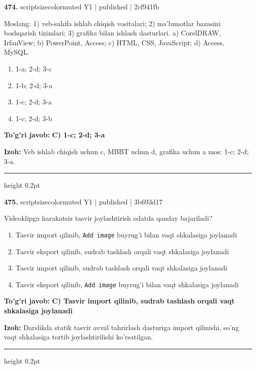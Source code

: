 \documentclass[10pt,a4paper]{article}
\begin{document}
{\bfseries\sffamily\color{ink} 474.} {scriptsizecolor{muted} Y1 | published | 2cf941fb}
\par
Moslang: 1) veb-sahifa ishlab chiqish vositalari; 2) ma'lumotlar bazasini boshqarish tizimlari; 3) grafika bilan ishlash dasturlari. a) CorelDRAW, IrfanView; b) PowerPoint, Access; c) HTML, CSS, JavaScript; d) Access, MySQL.
\begin{enumerate}[label=\Alph*),leftmargin=9mm]
\item 1-a; 2-d; 3-c
\item 1-b; 2-d; 3-a
\item 1-c; 2-d; 3-a
\item 1-c; 2-d; 3-b
\end{enumerate}
\begin{tcolorbox}[enhanced,breakable,colback=teal!4,colframe=teal!60!black,boxrule=0.45pt,arc=1.2mm,left=2.7mm,right=2.7mm,top=1.8mm,bottom=1.8mm,before skip=2mm,after skip=2mm]
{\bfseries\sffamily\color{teal}To'g'ri javob:} \textbf{C) 1-c; 2-d; 3-a}
\par\smallskip
{\bfseries Izoh:} Veb ishlab chiqish uchun c, MBBT uchun d, grafika uchun a mos: 1-c; 2-d; 3-a.
\end{tcolorbox}
\vspace{2mm}\hrule height 0.2pt\vspace{3mm}

{\bfseries\sffamily\color{ink} 475.} {scriptsizecolor{muted} Y1 | published | 3b693d17}
\par
Videoklipga harakatsiz tasvir joylashtirish odatda qanday bajariladi?
\begin{enumerate}[label=\Alph*),leftmargin=9mm]
\item Tasvir import qilinib, \texttt{Add image} buyrug'i bilan vaqt shkalasiga joylanadi
\item Tasvir eksport qilinib, sudrab tashlash orqali vaqt shkalasiga joylanadi
\item Tasvir import qilinib, sudrab tashlash orqali vaqt shkalasiga joylanadi
\item Tasvir eksport qilinib, \texttt{Add image} buyrug'i bilan vaqt shkalasiga joylanadi
\end{enumerate}
\begin{tcolorbox}[enhanced,breakable,colback=teal!4,colframe=teal!60!black,boxrule=0.45pt,arc=1.2mm,left=2.7mm,right=2.7mm,top=1.8mm,bottom=1.8mm,before skip=2mm,after skip=2mm]
{\bfseries\sffamily\color{teal}To'g'ri javob:} \textbf{C) Tasvir import qilinib, sudrab tashlash orqali vaqt shkalasiga joylanadi}
\par\smallskip
{\bfseries Izoh:} Darslikda statik tasvir avval tahrirlash dasturiga import qilinishi, so'ng vaqt shkalasiga tortib joylashtirilishi ko'rsatilgan.
\end{tcolorbox}
\vspace{2mm}\hrule height 0.2pt\vspace{3mm}
\end{document}
